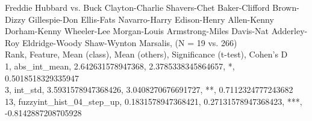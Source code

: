 Freddie Hubbard vs. Buck Clayton-Charlie Shavers-Chet Baker-Clifford Brown-Dizzy Gillespie-Don Ellis-Fats Navarro-Harry Edison-Henry Allen-Kenny Dorham-Kenny Wheeler-Lee Morgan-Louis Armstrong-Miles Davis-Nat Adderley-Roy Eldridge-Woody Shaw-Wynton Marsalis, (N = 19 vs. 266)\\
Rank, Feature, Mean (class), Mean (others), Significance (t-test), Cohen's D\\
1, abs_int_mean, 2.642631578947368, 2.3785338345864657, *, 0.5018518329335947\\
3, int_std, 3.5931578947368426, 3.0408270676691727, **, 0.7112324777243682\\
13, fuzzyint_hist_04_step_up, 0.1831578947368421, 0.27131578947368423, ***, -0.8142887208705928\\
